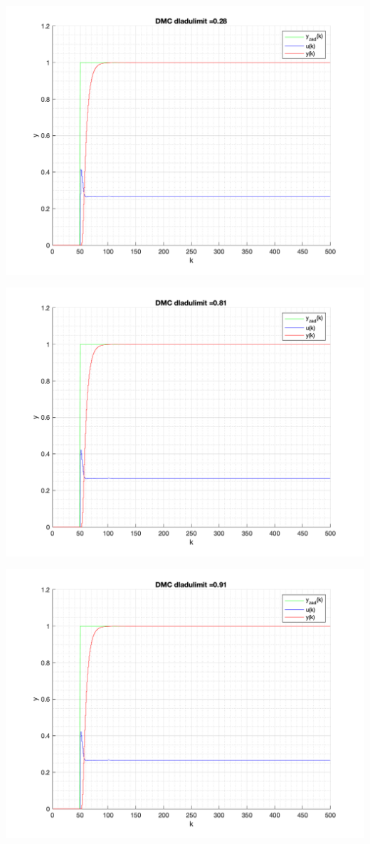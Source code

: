 \documentclass[a4paper, 11pt]{article}
\begin{document}
\begin{enumerate}
 \includegraphics[width=\linewidth]{./ModelsP6_dulimit/P4_DMC_dulimit_0_28_png.png} 
 
 \includegraphics[width=\linewidth]{./ModelsP6_dulimit/P4_DMC_dulimit_0_81_png.png} 
 
 \includegraphics[width=\linewidth]{./ModelsP6_dulimit/P4_DMC_dulimit_0_91_png.png} 
 

\end{enumerate}
\end{document}
